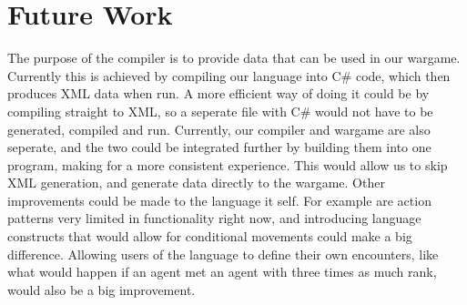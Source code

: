 \chapter{Future Work}
The purpose of the compiler is to provide data that can be used in our wargame. 
Currently this is achieved by compiling our language into C\# code, which then produces XML data when run. 
A more efficient way of doing it could be by compiling straight to XML, so a seperate file with C\# would not have to be generated, compiled and run.\newline
Currently, our compiler and wargame are also seperate, and the two could be integrated further by building them into one program, making for a more consistent experience. 
This would allow us to skip XML generation, and generate data directly to the wargame.\newline
Other improvements could be made to the language it self. 
For example are action patterns very limited in functionality right now, and introducing language constructs that would allow for conditional movements could make a big difference. 
Allowing users of the language to define their own encounters, like what would happen if an agent met an agent with three times as much rank, would also be a big improvement.